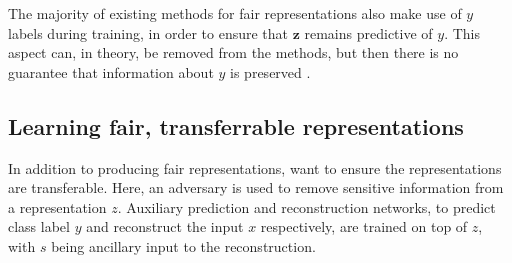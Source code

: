 The majority of existing methods for fair representations also make use of $y$ labels during
training, in order to ensure that $\bm{z}$ remains predictive of $y$. This aspect can, in theory,
be removed from the methods, but then there is no guarantee that information about $y$ is preserved
\citep{louizos2016variational}. 

\subsection{Learning fair, transferrable representations}
In addition to producing fair representations, \citet{madras2018learning} want to ensure the
representations are transferable. Here, an adversary is used to remove sensitive information from
a representation $z$. Auxiliary prediction and reconstruction networks, to predict class label $y$
and reconstruct the input $x$ respectively, are trained on top of $z$, with $s$ being ancillary
input to the reconstruction.

